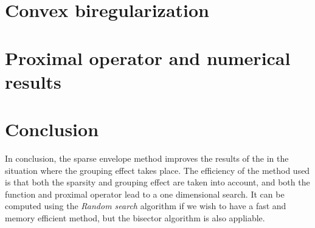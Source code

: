 \documentclass{article}
\begin{document}
\section{Convex biregularization}


\section{Proximal operator and numerical results}



\section*{Conclusion}

In conclusion, the sparse envelope method improves the results of the \enet in the situation where the grouping effect takes place. The efficiency of the method used is that both the sparsity and grouping effect are taken into account, and both the function and proximal operator lead to a one dimensional search. It can be computed using the \textit{Random search} algorithm if we wish to have a fast and memory efficient method, but the bisector algorithm is also appliable. 



\nocite{*}
\printbibliography
\end{document}
